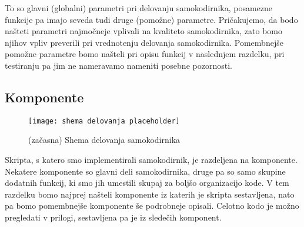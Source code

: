 \documentclass[12pt,a4paper]{article}
\begin{document}
To so glavni (globalni) parametri pri delovanju samokodirnika, posamezne funkcije pa imajo seveda tudi druge (pomožne) parametre.
Pričakujemo, da bodo našteti parametri najmočneje vplivali na kvaliteto samokodirnika, zato bomo njihov vpliv preverili pri vrednotenju delovanja samokodirnika. 
Pomembnejše pomožne parametre bomo našteli pri opisu funkcij v naslednjem razdelku, pri testiranju pa jim ne nameravamo nameniti posebne pozornosti.


\subsection{Komponente}

\begin{figure}[h!]

	\begin{center}
	\texttt{[image: shema delovanja placeholder]}
	\end{center}
	
	\caption{(začasna) Shema delovanja samokodirnika}
\end{figure}

Skripta, s katero smo implementirali samokodirnik, je razdeljena na komponente.
Nekatere komponente so glavni deli samokodirnika, druge pa so samo skupine dodatnih funkcij, ki smo jih umestili skupaj za boljšo organizacijo kode.
V tem razdelku bomo najprej našteli komponente iz katerih je skripta sestavljena, nato pa bomo pomembnejše komponente še podrobneje opisali.
Celotno kodo je možno pregledati v prilogi, sestavljena pa je iz sledečih komponent. %
\end{document}
